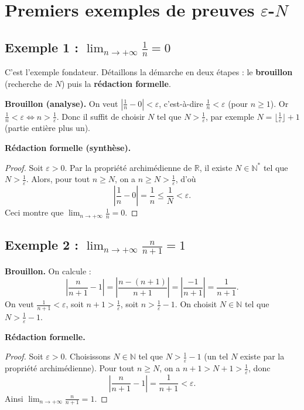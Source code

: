 \documentclass[12pt,a4paper,openany]{book}
\theoremstyle{definition}
\newcommand{\N}{\mathbb{N}}
\newcommand{\R}{\mathbb{R}}
\newcommand{\eps}{\varepsilon}
\newcommand{\abs}[1]{\left\lvert #1 \right\rvert}
\begin{document}
\section{Premiers exemples de preuves $\eps$-$N$}\label{sec:suites:exemples-eps-N}

\subsection{Exemple 1 : $\lim_{n \to +\infty} \frac{1}{n} = 0$}

C'est l'exemple fondateur. Détaillons la démarche en deux étapes : le \textbf{brouillon}
(recherche de $N$) puis la \textbf{rédaction formelle}.

\medskip

\noindent\textbf{Brouillon (analyse).}
On veut $\abs{\frac{1}{n} - 0} < \eps$, c'est-à-dire $\frac{1}{n} < \eps$ (pour $n \geq 1$).
Or $\frac{1}{n} < \eps \iff n > \frac{1}{\eps}$.
Donc il suffit de choisir $N$ tel que $N > \frac{1}{\eps}$, par exemple
$N = \lfloor \frac{1}{\eps} \rfloor + 1$ (partie entière plus un).

\medskip

\noindent\textbf{Rédaction formelle (synthèse).}

\begin{proof}
  Soit $\eps > 0$. Par la propriété archimédienne de $\R$, il existe $N \in \N^*$
  tel que $N > \frac{1}{\eps}$. Alors, pour tout $n \geq N$, on a $n \geq N > \frac{1}{\eps}$,
  d'où
  \[
    \abs{\frac{1}{n} - 0} = \frac{1}{n} \leq \frac{1}{N} < \eps.
  \]
  Ceci montre que $\lim_{n \to +\infty} \frac{1}{n} = 0$.
\end{proof}

\subsection{Exemple 2 : $\lim_{n \to +\infty} \frac{n}{n+1} = 1$}

\noindent\textbf{Brouillon.}
On calcule :
\[
  \abs{\frac{n}{n+1} - 1} = \abs{\frac{n - (n+1)}{n+1}} = \abs{\frac{-1}{n+1}} = \frac{1}{n+1}.
\]
On veut $\frac{1}{n+1} < \eps$, soit $n+1 > \frac{1}{\eps}$, soit $n > \frac{1}{\eps} - 1$.
On choisit $N \in \N$ tel que $N > \frac{1}{\eps} - 1$.

\medskip

\noindent\textbf{Rédaction formelle.}

\begin{proof}
  Soit $\eps > 0$. Choisissons $N \in \N$ tel que $N > \frac{1}{\eps} - 1$
  (un tel $N$ existe par la propriété archimédienne). Pour tout $n \geq N$, on a
  $n + 1 > N + 1 > \frac{1}{\eps}$, donc
  \[
    \abs{\frac{n}{n+1} - 1} = \frac{1}{n+1} < \eps.
  \]
  Ainsi $\lim_{n \to +\infty} \frac{n}{n+1} = 1$.
\end{proof}
\end{document}
